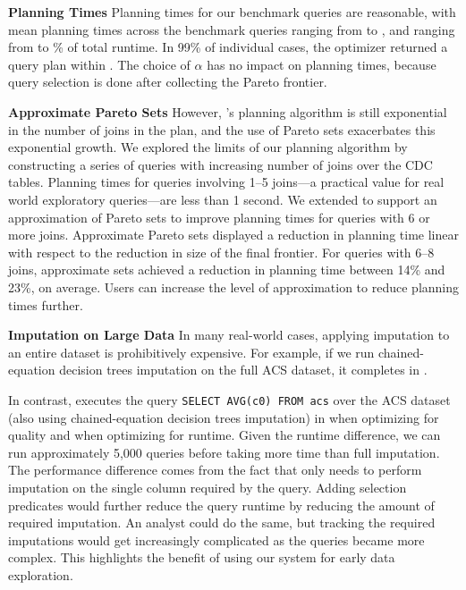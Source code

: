 {\textbf{Planning Times}\quad
Planning times for our benchmark queries are reasonable, with mean planning times across the
benchmark queries ranging from \planningtimelow{} to \planningtimehigh{}, and ranging from
\planningtimelowpct{} to \planningtimehighpct{}\% of total runtime. In 99\% of individual
cases, the optimizer returned a query plan within \planningtimepninetynine{}. The choice of
$\alpha$ has no impact on planning times, because query selection is done after collecting
the Pareto frontier.

\textbf{Approximate Pareto Sets}\quad
However, \ProjectName{}'s planning algorithm is still exponential in the number of joins in the plan, and the use of Pareto sets exacerbates this exponential growth.
We explored the limits of our planning algorithm by constructing a series of queries with increasing number of joins over the CDC tables.
Planning times for queries involving 1--5 joins---a practical value for  real world exploratory queries---are less than 1 second.
We extended \ProjectName{} to support an approximation of Pareto sets to improve planning times for queries with 6 or more joins. Approximate Pareto sets
displayed a reduction in planning time linear with respect to the reduction in size of the final frontier. For queries with 6--8 joins, approximate sets achieved a reduction
in planning time between 14\% and 23\%, on average. Users can increase the level of approximation to reduce planning times further.

\textbf{Imputation on Large Data}\quad
In many real-world cases, applying imputation to an entire dataset is prohibitively expensive.
For example, if we run chained-equation decision trees imputation on the full ACS dataset, it completes in \acsbaseresultminutes{}.

In contrast, \ProjectName{} executes the query \lstinline{SELECT AVG(c0) FROM acs} over the ACS dataset (also using chained-equation decision trees imputation) in \acsimputedbzeroresult{} when optimizing for quality and \acsimputedboneresult{} when optimizing for runtime. 
Given the runtime difference, we can run approximately 5,000 queries before taking more time than full imputation.
The performance difference comes from the fact that \ProjectName{} only needs to perform imputation on the single column required by the query.
Adding selection predicates would further reduce the query runtime by reducing the amount of required imputation.
An analyst could do the same, but tracking the required imputations would get increasingly complicated as the queries became more complex.
This highlights the benefit of using our system for early data exploration.
}


